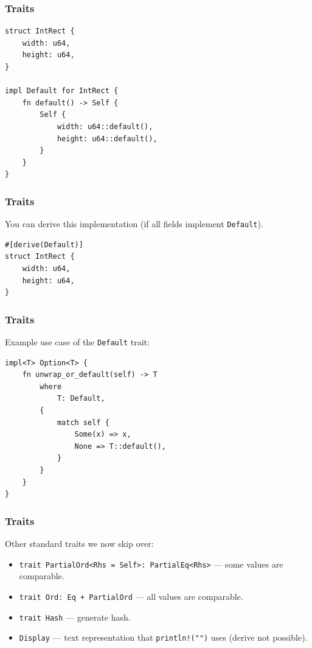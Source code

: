\begin{frame}[fragile]
    \frametitle{Traits}
    \begin{verbatim}
struct IntRect {
    width: u64,
    height: u64,
}

impl Default for IntRect {
    fn default() -> Self {
        Self {
            width: u64::default(),
            height: u64::default(),
        }
    }
}
    \end{verbatim}
\end{frame}

\begin{frame}[fragile]
    \frametitle{Traits}
    You can derive this implementation (if all fields implement \texttt{Default}).
    \vfill
    \begin{verbatim}
#[derive(Default)]
struct IntRect {
    width: u64,
    height: u64,
}
    \end{verbatim}
\end{frame}

\begin{frame}[fragile]
    \frametitle{Traits}
    Example use case of the \texttt{Default} trait:
    \vfill
    \begin{verbatim}
impl<T> Option<T> {
    fn unwrap_or_default(self) -> T
        where
            T: Default,
        {
            match self {
                Some(x) => x,
                None => T::default(),
            }
        }
    }
}
    \end{verbatim}
\end{frame}

\begin{frame}[fragile]
    \frametitle{Traits}
    Other standard traits we now skip over:
    \vfill
    \begin{itemize}
        \item \texttt{trait PartialOrd<Rhs = Self>: PartialEq<Rhs>} --- some values are comparable.
        \item \texttt{trait Ord: Eq + PartialOrd} --- all values are comparable.
        \pause
        \item \texttt{trait Hash} --- generate hash.
        \pause
        \item \texttt{Display} --- text representation that \texttt{println!("{}")} uses (derive not possible).
    \end{itemize}
\end{frame}

